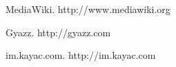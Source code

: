 \begin{thebibliography}{10}

MediaWiki. http://www.mediawiki.org

Gyazz. http://gyazz.com

im.kayac.com. http://im.kayac.com

\end{thebibliography}
